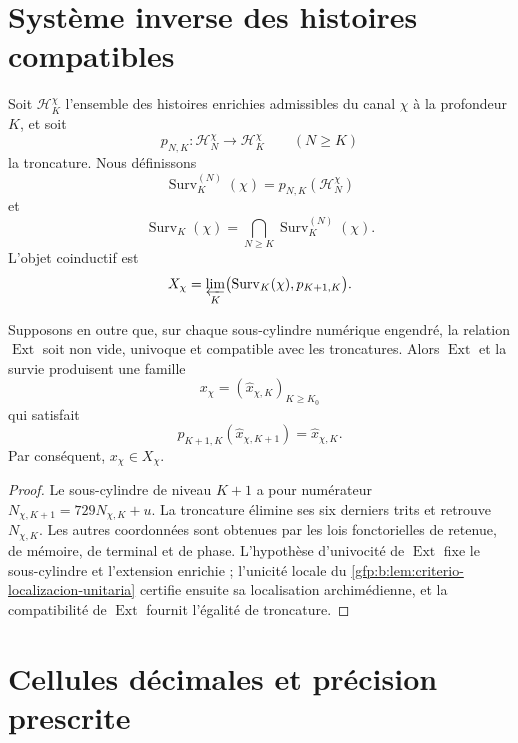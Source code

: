 \section{Système inverse des histoires compatibles}

Soit \(\mathcal H_K^\chi\) l’ensemble des histoires enrichies admissibles
du canal \(\chi\) à la profondeur \(K\), et soit
\[
 p_{N,K}:\mathcal H_N^\chi\longrightarrow\mathcal H_K^\chi
 \qquad(N\geq K)
\]
la troncature. Nous définissons
\[
 \operatorname{Surv}_K^{(N)}(\chi)
 =p_{N,K}(\mathcal H_N^\chi)
\]
et
\begin{equation}
 \operatorname{Surv}_K(\chi)
 =\bigcap_{N\geq K}\operatorname{Surv}_K^{(N)}(\chi).
 \label{gfp:b:eq:supervivencia-todas-profundidades}
\end{equation}
L’objet coinductif est
\begin{equation}
 X_\chi=
 \varprojlim_K
 \bigl(\operatorname{Surv}_K(\chi),p_{K+1,K}\bigr).
 \label{gfp:b:eq:limite-inverso-caracteres}
\end{equation}

\begin{theorem}
\label{gfp:b:thm:seccion-compatible-caracteres}
Supposons en outre que, sur chaque sous-cylindre numérique engendré, la
relation \(\operatorname{Ext}\) soit non vide, univoque et compatible avec les
troncatures. Alors \(\operatorname{Ext}\) et la survie produisent une famille
\[
 x_\chi=(\widehat x_{\chi,K})_{K\geq K_0}
\]
qui satisfait
\[
 p_{K+1,K}(\widehat x_{\chi,K+1})
 =\widehat x_{\chi,K}.
\]
Par conséquent, \(x_\chi\in X_\chi\).
\end{theorem}

\begin{proof}
Le sous-cylindre de niveau \(K+1\) a pour numérateur
\(N_{\chi,K+1}=729N_{\chi,K}+u\). La troncature élimine ses six derniers
trits et retrouve \(N_{\chi,K}\). Les autres coordonnées sont obtenues par les
lois fonctorielles de retenue, de mémoire, de terminal et de phase. L’hypothèse
d’univocité de \(\operatorname{Ext}\) fixe le sous-cylindre et l’extension
enrichie ; l’unicité locale du
\cref{gfp:b:lem:criterio-localizacion-unitaria} certifie ensuite sa
localisation archimédienne, et la compatibilité de \(\operatorname{Ext}\)
fournit l’égalité de troncature.
\end{proof}

\section{Cellules décimales et précision prescrite}


